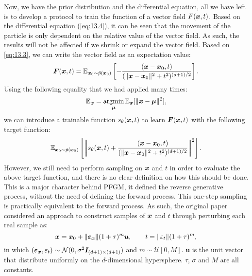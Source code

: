 Now, we have the prior distribution and the differential equation, all we have left is to develop a protocol to train the function of a vector field $F(\bm{x},t)$. Based on the differential equation (\ref{eq:13.4}), it can be seen that the movement of the particle is only dependent on the relative value of the vector field. As such, the results will not be affected if we shrink or expand the vector field. Based on \cref{eq:13.3}, we can write the vector field as an expectation value:
\begin{equation}
    \label{eq:13.8}
    \bm{F}(\bm{x},t)=\mathbb{E}_{\bm{x}_0\sim\tilde{p}(\bm{x}_{0})}\left[ -\frac{(\bm{x}-\bm{x}_0,t)}{(\|\bm{x}-\bm{x}_0\|^2+t^2)^{(d+1)/2}}\right].
\end{equation}
Using the following equality that we had applied many times:
\begin{equation}
    \label{eq:13.9}
    \mathbb{E}_{\bm{x}}=\operatorname*{argmin}_{\bm{\mu}}\mathbb{E}_{\bm{x}}[\|\bm{x}-\bm{\mu}\|^2],
\end{equation}
we  can introduce a trainable function $s_\theta(\bm{x},t)$ to learn $\bm{F}(\bm{x},t)$ with the following target function:
\begin{equation}
    \label{eq:13.10}
    \mathbb{E}_{\bm{x}_0\sim\tilde{p}(\bm{x}_{0})}\left[ \left\|  s_\theta(\bm{x},t)  + \frac{(\bm{x}-\bm{x}_0,t)}{(\|\bm{x}-\bm{x}_0\|^2+t^2)^{(d+1)/2}}\right\|^2\right].
\end{equation}
However, we still need to perform sampling on $\bm{x}$ and $t$ in order to evaluate the above target function, and there is no clear definition on how this should be done. This is a major character behind PFGM, it defined the reverse generative process, without the need of defining the forward process. This one-step sampling is practically equivalent to the forward process. As such, the original paper considered an approach to construct samples of $\bm{x}$ and $t$ through perturbing each real sample as:
\begin{equation}
    \bm{x}=\bm{x}_0+\|\bm{\varepsilon}_{\bm{x}}\|(1+\tau)^{m}\bm{u},\qquad t=\|\varepsilon_t\|(1+\tau)^{m},
\end{equation}
in which $(\bm{\varepsilon}_{\bm{x}},\varepsilon_t)\sim\mathcal{N}(0,\sigma^2\bm{I}_{(d+1)\times(d+1)})$ and $m\sim\mathcal{U}[0,M]$. $\bm{u}$ is the unit vector that distribute uniformly on the $d$-dimensional hypersphere. $\tau$, $\sigma$ and $M$ are all constants.

